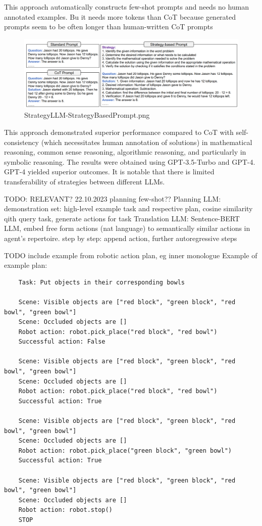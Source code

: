 \documentclass{article}
\begin{document}
This approach automatically constructs few-shot prompts and  needs no  human annotated examples. Bu it needs more tokens than CoT because generated prompts seem to be  often longer than human-written CoT prompts
\begin{figure}[h]
	\centering
	\includegraphics[width=0.9\linewidth]{StrategyLLM-StrategyBasedPrompt.png}
	\caption{StrategyLLM-StrategyBasedPrompt.png \cite{gao_strategyllm_2024}}
	\label{fig:strategyllmprompt}
\end{figure}
This approach demonstrated superior performance compared to CoT with self-consistency (which necessitates human annotation of solutions) in mathematical reasoning, common sense reasoning, algorithmic reasoning, and particularly in symbolic reasoning. The results were obtained using GPT-3.5-Turbo and GPT-4. GPT-4 yielded superior outcomes. It is notable that there is limited transferability of strategies between different LLMs.


TODO: RELEVANT? 
\cite{raman_cape_2023} 22.10.2023 planning few-shot??
Planning LLM: demonstration set: high-level example task and respective plan, cosine similarity qith query task, generate actions for task
Translation LLM: Sentence-BERT LLM, embed free form actions (nat language) to semantically similar actions in agent's repertoire. step by step: append action, further autoregressive steps

TODO include example from robotic action plan, eg inner monologue \cite{huang_inner_2022}
Example of example plan:
\begin{verbatim}
	Task: Put objects in their corresponding bowls 
	
	Scene: Visible objects are ["red block", "green block", "red bowl", "green bowl"] 
	Scene: Occluded objects are [] 
	Robot action: robot.pick_place("red block", "red bowl") 
	Successful action: False 
	
	Scene: Visible objects are ["red block", "green block", "red bowl", "green bowl"] 
	Scene: Occluded objects are [] 
	Robot action: robot.pick_place("red block", "red bowl") 
	Successful action: True 
	
	Scene: Visible objects are ["red block", "green block", "red bowl", "green bowl"] 
	Scene: Occluded objects are [] 
	Robot action: robot.pick_place("green block", "green bowl") 
	Successful action: True 
	
	Scene: Visible objects are ["red block", "green block", "red bowl", "green bowl"] 
	Scene: Occluded objects are [] 
	Robot action: robot.stop() 
	STOP
\end{verbatim}
\end{document}
